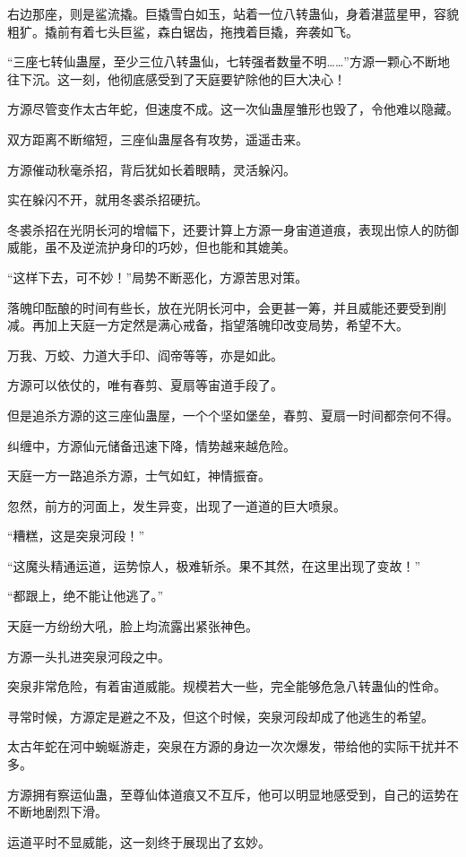 \begin{this_body}
右边那座，则是鲨流撬。巨撬雪白如玉，站着一位八转蛊仙，身着湛蓝星甲，容貌粗犷。撬前有着七头巨鲨，森白锯齿，拖拽着巨撬，奔袭如飞。

“三座七转仙蛊屋，至少三位八转蛊仙，七转强者数量不明……”方源一颗心不断地往下沉。这一刻，他彻底感受到了天庭要铲除他的巨大决心！

方源尽管变作太古年蛇，但速度不成。这一次仙蛊屋雏形也毁了，令他难以隐藏。

双方距离不断缩短，三座仙蛊屋各有攻势，遥遥击来。

方源催动秋毫杀招，背后犹如长着眼睛，灵活躲闪。

实在躲闪不开，就用冬裘杀招硬抗。

冬裘杀招在光阴长河的增幅下，还要计算上方源一身宙道道痕，表现出惊人的防御威能，虽不及逆流护身印的巧妙，但也能和其媲美。

“这样下去，可不妙！”局势不断恶化，方源苦思对策。

落魄印酝酿的时间有些长，放在光阴长河中，会更甚一筹，并且威能还要受到削减。再加上天庭一方定然是满心戒备，指望落魄印改变局势，希望不大。

万我、万蛟、力道大手印、阎帝等等，亦是如此。

方源可以依仗的，唯有春剪、夏扇等宙道手段了。

但是追杀方源的这三座仙蛊屋，一个个坚如堡垒，春剪、夏扇一时间都奈何不得。

纠缠中，方源仙元储备迅速下降，情势越来越危险。

天庭一方一路追杀方源，士气如虹，神情振奋。

忽然，前方的河面上，发生异变，出现了一道道的巨大喷泉。

“糟糕，这是突泉河段！”

“这魔头精通运道，运势惊人，极难斩杀。果不其然，在这里出现了变故！”

“都跟上，绝不能让他逃了。”

天庭一方纷纷大吼，脸上均流露出紧张神色。

方源一头扎进突泉河段之中。

突泉非常危险，有着宙道威能。规模若大一些，完全能够危急八转蛊仙的性命。

寻常时候，方源定是避之不及，但这个时候，突泉河段却成了他逃生的希望。

太古年蛇在河中蜿蜒游走，突泉在方源的身边一次次爆发，带给他的实际干扰并不多。

方源拥有察运仙蛊，至尊仙体道痕又不互斥，他可以明显地感受到，自己的运势在不断地剧烈下滑。

运道平时不显威能，这一刻终于展现出了玄妙。


\end{this_body}
